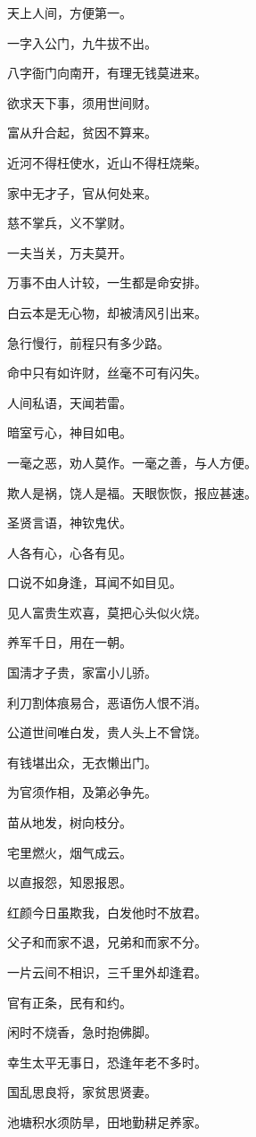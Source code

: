 \documentclass[12pt,oneside]{book}
\begin{document}
天上人间，方便第一。

一字入公门，九牛拔不出。

八字衙门向南开，有理无钱莫进来。

欲求天下事，须用世间财。

富从升合起，贫因不算来。

近河不得枉使水，近山不得枉烧柴。

家中无才子，官从何处来。

慈不掌兵，义不掌财。

一夫当关，万夫莫开。

万事不由人计较，一生都是命安排。

白云本是无心物，却被淸风引出来。

急行慢行，前程只有多少路。

命中只有如许财，丝毫不可有闪失。

人间私语，天闻若雷。

暗室亏心，神目如电。

一毫之恶，劝人莫作。一毫之善，与人方便。

欺人是祸，饶人是福。天眼恢恢，报应甚速。

圣贤言语，神钦鬼伏。

人各有心，心各有见。

口说不如身逢，耳闻不如目见。

见人富贵生欢喜，莫把心头似火烧。

养军千日，用在一朝。

国淸才子贵，家富小儿骄。

利刀割体痕易合，恶语伤人恨不消。

公道世间唯白发，贵人头上不曾饶。

有钱堪出众，无衣懒出门。

为官须作相，及第必争先。

苗从地发，树向枝分。

宅里燃火，烟气成云。

以直报怨，知恩报恩。

红颜今日虽欺我，白发他时不放君。

父子和而家不退，兄弟和而家不分。

一片云间不相识，三千里外却逢君。

官有正条，民有和约。

闲时不烧香，急时抱佛脚。

幸生太平无事日，恐逢年老不多时。

国乱思良将，家贫思贤妻。

池塘积水须防旱，田地勤耕足养家。
\end{document}

